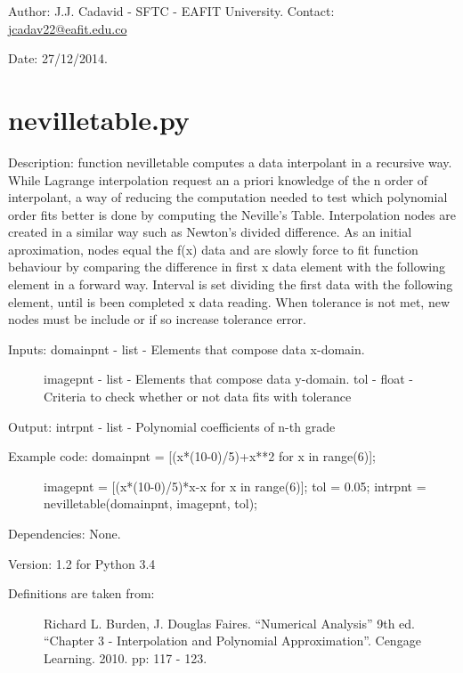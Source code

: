 \documentclass[letterpaper,10pt,oneside]{sphinxmanual}
\theoremstyle{plain}%
\theoremstyle{definition}%
\theoremstyle{remark}%
\begin{document}
Author: J.J. Cadavid - SFTC - EAFIT University.
Contact: \href{mailto:jcadav22@eafit.edu.co}{jcadav22@eafit.edu.co}

Date: 27/12/2014.


\section{nevilletable.py}
\label{code:nevilletable-py}\label{code:module-nevilletable}
Description: function nevilletable computes a data interpolant in a recursive
way.  While Lagrange interpolation request an a priori knowledge of the n
order of interpolant, a way of reducing the computation needed to test
which polynomial order fits better is done by computing the Neville's Table.
Interpolation nodes are created in a similar way such as Newton's divided
difference. As an initial aproximation, nodes equal the f(x) data and are
slowly force to fit function behaviour by comparing the difference in first 
x data element with the following element in a forward way. Interval is set
dividing the first data with the following element, until is been completed
x data reading. When tolerance is not met, new nodes must be include or if 
so increase tolerance error.
\begin{description}
\item[{Inputs: domainpnt - list - Elements that compose data x-domain. }] \leavevmode
imagepnt - list - Elements that compose data y-domain.
tol - float - Criteria to check whether or not data fits with tolerance

\end{description}

Output: intrpnt - list - Polynomial coefficients of n-th grade
\begin{description}
\item[{Example code: domainpnt = {[}(x*(10-0)/5)+x**2 for x in range(6){]};}] \leavevmode
imagepnt = {[}(x*(10-0)/5)*x-x for x in range(6){]};
tol = 0.05;
intrpnt = nevilletable(domainpnt, imagepnt, tol);

\end{description}

Dependencies: None.

Version: 1.2 for Python 3.4
\begin{description}
\item[{Definitions are taken from:}] \leavevmode
Richard L. Burden, J. Douglas Faires. ``Numerical Analysis'' 9th ed.
``Chapter 3 - Interpolation and Polynomial Approximation''. 
Cengage Learning. 2010. pp: 117 - 123.

\end{description}
\end{document}
